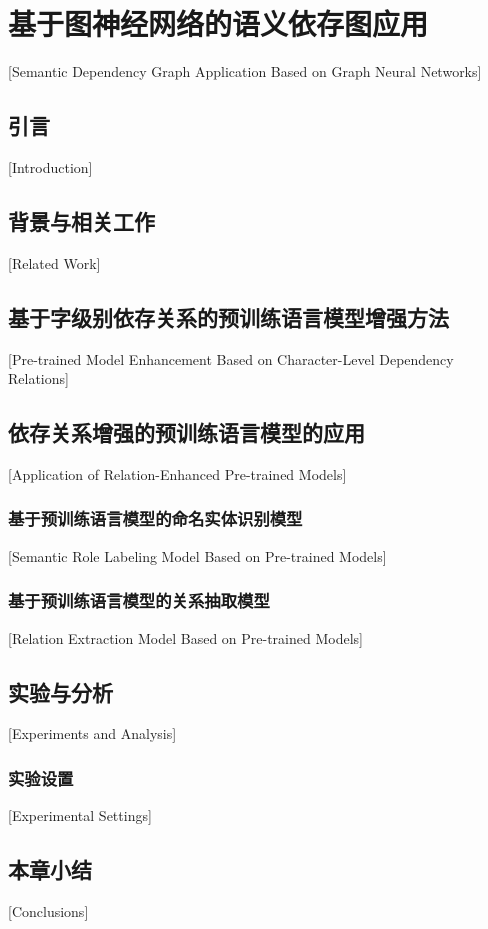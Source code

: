 
\chapter[基于图神经网络的语义依存图应用]{基于图神经网络的语义依存图应用}[Semantic Dependency Graph Application Based on Graph Neural Networks]

\section{引言}[Introduction]

\section{背景与相关工作}[Related Work]

\section{基于字级别依存关系的预训练语言模型增强方法}[Pre-trained Model Enhancement Based on Character-Level Dependency Relations]


\section{依存关系增强的预训练语言模型的应用}[Application of Relation-Enhanced Pre-trained Models]

\subsection{基于预训练语言模型的命名实体识别模型}[Semantic Role Labeling Model Based on Pre-trained Models]

\subsection{基于预训练语言模型的关系抽取模型}[Relation Extraction Model Based on Pre-trained Models]


\section{实验与分析}[Experiments and Analysis]

\subsection{实验设置}[Experimental Settings]


\section{本章小结}[Conclusions]


